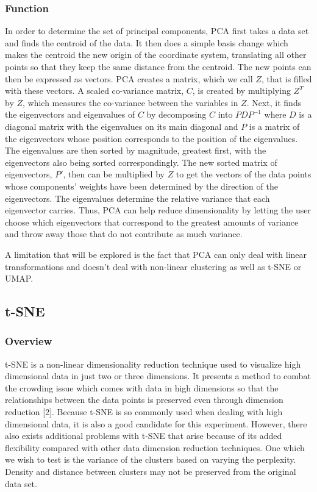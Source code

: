 \documentclass[11pt]{article}
\theoremstyle{definition}
\begin{document}
\subsubsection{Function}
In order to determine the set of principal components, PCA first takes a data set and finds the centroid of the data. It then does a simple basis change which makes the centroid the new origin of the coordinate system, translating all other points so that they keep the same distance from the centroid. The new points can then be expressed as vectors. PCA creates a matrix, which we call $Z$, that is filled with these vectors. A scaled co-variance matrix, $C$, is created by multiplying $Z^T$ by $Z$, which measures the co-variance between the variables in $Z$. Next, it finds the eigenvectors and eigenvalues of $C$ by decomposing $C$ into $PDP^{-1}$ where $D$ is a diagonal matrix with the eigenvalues on its main diagonal and $P$ is a matrix of the eigenvectors whose position corresponds to the position of the eigenvalues. The eigenvalues are then sorted by magnitude, greatest first, with the eigenvectors also being sorted correspondingly. The new sorted matrix of eigenvectors, $P'$, then can be multiplied by $Z$ to get the vectors of the data points whose components' weights have been determined by the direction of the eigenvectors. The eigenvalues determine the relative variance that each eigenvector carries. Thus, PCA can help reduce dimensionality by letting the user choose which eigenvectors that correspond to the greatest amounts of variance and throw away those that do not contribute as much variance. 

A limitation that will be explored is the fact that PCA can only deal with linear transformations and doesn't deal with non-linear clustering as well as t-SNE or UMAP.

\subsection{t-SNE}
\subsubsection{Overview}
t-SNE is a non-linear dimensionality reduction technique used to visualize high dimensional data in just two or three dimensions. It presents a method to combat the crowding issue which comes with data in high dimensions so that the relationships between the data points is preserved even through dimension reduction [2]. Because t-SNE is so commonly used when dealing with high dimensional data, it is also a good candidate for this experiment. However, there also exists additional problems with t-SNE that arise because of its added flexibility compared with other data dimension reduction techniques. One which we wish to test is the variance of the clusters based on varying the perplexity. Density and distance between clusters may not be preserved from the original data set.
\end{document}
